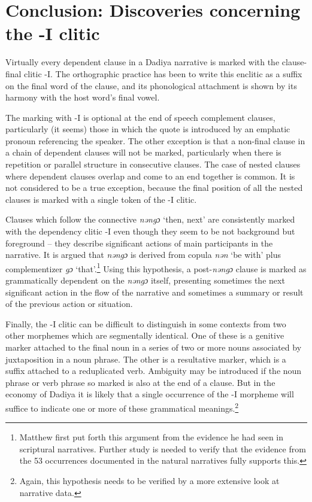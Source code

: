 \documentclass[output=paper]{langscibook}
\begin{document}
\section{Conclusion: Discoveries concerning the -I clitic}

Virtually every dependent clause in a Dadiya narrative is marked with the clause-final clitic -I. The orthographic practice has been to write this enclitic as a suffix on the final word of the clause, and its phonological attachment is shown by its harmony with the host word's final vowel.

The marking with -I is optional at the end of speech complement clauses, particularly (it seems) those in which the quote is introduced by an emphatic pronoun referencing the speaker. The other exception is that a non-final clause in a chain of dependent clauses will not be marked, particularly when there is repetition or parallel structure in consecutive clauses. The case of nested clauses where dependent clauses overlap and come to an end together is common. It is not considered to be a true exception, because the final position of all the nested clauses is marked with a single token of the -I clitic.

\begin{sloppypar}
Clauses which follow the connective \textit{nəngɔ} `then, next' are consistently marked with the dependency clitic -I even though they seem to be not background but foreground – they describe significant actions of main participants in the narrative. It is argued that \textit{nəngɔ} is derived from copula \textit{nən} `be with' plus complementizer \textit{gɔ} `that'.\footnote{Matthew \citet[4]{Harley2017} first put forth this argument from the evidence he had seen in scriptural narratives. Further study is needed to verify that the evidence from the 53 occurrences documented in the natural narratives fully supports this.} Using this hypothesis, a post-\textit{nəngɔ} clause is marked as grammatically dependent on the \textit{nəngɔ} itself, presenting sometimes the next significant action in the flow of the narrative and sometimes a summary or result of the previous action or situation.
\end{sloppypar}

Finally, the -I clitic can be difficult to distinguish in some contexts from two other morphemes which are segmentally identical. One of these is a genitive marker attached to the final noun in a series of two or more nouns associated by juxtaposition in a noun phrase. The other is a resultative marker, which is a suffix attached to a reduplicated verb. Ambiguity may be introduced if the noun phrase or verb phrase so marked is also at the end of a clause. But in the economy of Dadiya it is likely that a single occurrence of the -I morpheme will suffice to indicate one or more of these grammatical meanings.\footnote{Again, this hypothesis needs to be verified by a more extensive look at narrative data.}
\end{document}
